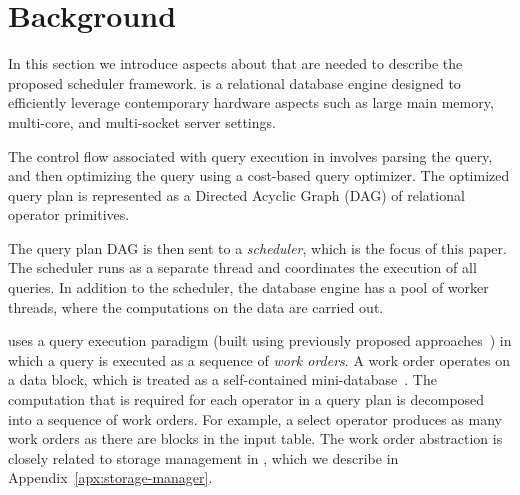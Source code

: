 \section{Background}\label{sec:background}
In this section we introduce aspects about \sys{} that are needed to 
describe the proposed scheduler framework.
\sys{} is a relational database engine 
designed to efficiently leverage contemporary hardware aspects such as large main memory, multi-core, and multi-socket server settings. 

The control flow associated with query execution in \sys{} involves 
parsing the query, and then optimizing the query using a cost-based query 
optimizer.
The optimized query plan is represented as a Directed Acyclic 
Graph (DAG) of relational operator primitives. 

The query plan DAG is then sent to a \textit{scheduler}, which is the focus of this paper. 
The scheduler runs as a separate thread and coordinates the execution of all queries. 
In addition to the scheduler, the database engine has a pool of worker 
threads, where the computations on the data are carried out. 

\sys{} uses a query execution paradigm (built using previously proposed approaches~\cite{qsstorage,morsel}) in which a query is executed as a sequence of \textit{work orders}. 
A work order operates on a data block, which is treated as a self-contained mini-database~\cite{qsstorage}. 
The computation that is required for each operator in a query plan is decomposed into a sequence of work orders. 
For example, a select operator produces as many work orders as there are blocks in the input table. 
The work order abstraction is closely related to storage management in \sys{}, which we describe in Appendix~\ref{apx:storage-manager}.